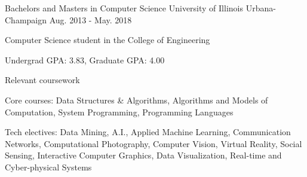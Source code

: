 

\begin{cventries}

  \cventry
    {Bachelors and Masters in Computer Science} %
    {University of Illinois} %
    {Urbana-Champaign} %
    {Aug. 2013 - May. 2018} %
    {
      \begin{cvitems} %
        \item {Computer Science student in the College of Engineering}
        \item {Undergrad GPA: 3.83, Graduate GPA: 4.00}
      \end{cvitems}
    }

  \cventry
    {Relevant coursework} %
    {} %
    {} %
    {} %
    {
      \begin{cvitems} %
        \item {Core courses: Data Structures \& Algorithms, Algorithms and Models of Computation, System Programming, Programming Languages}
        \item {Tech electives: Data Mining, A.I., Applied Machine Learning, Communication Networks, Computational Photography, Computer Vision, Virtual Reality, Social Sensing, Interactive Computer Graphics, Data Visualization, Real-time and Cyber-physical Systems}
      \end{cvitems}
    }

\end{cventries}
